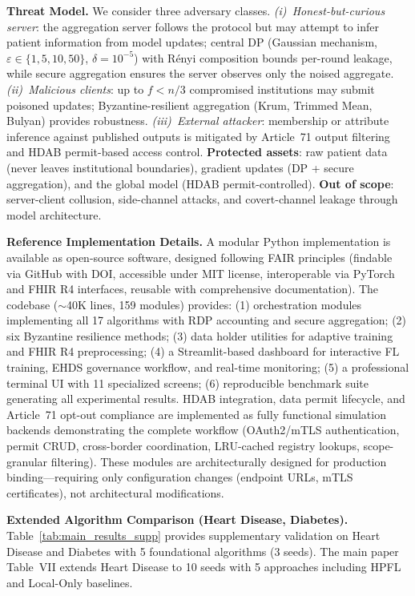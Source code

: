 \documentclass[conference]{IEEEtran}
\begin{document}
\smallskip\noindent\textbf{Threat Model.}
We consider three adversary classes. \textit{(i)~Honest-but-curious server}: the aggregation server follows the protocol but may attempt to infer patient information from model updates; central DP (Gaussian mechanism, $\varepsilon \in \{1{,}5{,}10{,}50\}$, $\delta{=}10^{-5}$) with R\'{e}nyi composition bounds per-round leakage, while secure aggregation ensures the server observes only the noised aggregate. \textit{(ii)~Malicious clients}: up to $f < n/3$ compromised institutions may submit poisoned updates; Byzantine-resilient aggregation (Krum, Trimmed Mean, Bulyan) provides robustness. \textit{(iii)~External attacker}: membership or attribute inference against published outputs is mitigated by Article~71 output filtering and HDAB permit-based access control. \textbf{Protected assets}: raw patient data (never leaves institutional boundaries), gradient updates (DP + secure aggregation), and the global model (HDAB permit-controlled). \textbf{Out of scope}: server-client collusion, side-channel attacks, and covert-channel leakage through model architecture.

\smallskip\noindent\textbf{Reference Implementation Details.}
A modular Python implementation is available as open-source software, designed following FAIR principles (findable via GitHub with DOI, accessible under MIT license, interoperable via PyTorch and FHIR R4 interfaces, reusable with comprehensive documentation). The codebase ($\sim$40K lines, 159 modules) provides: (1) orchestration modules implementing all 17 algorithms with RDP accounting and secure aggregation; (2) six Byzantine resilience methods; (3) data holder utilities for adaptive training and FHIR R4 preprocessing; (4) a Streamlit-based dashboard for interactive FL training, EHDS governance workflow, and real-time monitoring; (5) a professional terminal UI with 11 specialized screens; (6) reproducible benchmark suite generating all experimental results. HDAB integration, data permit lifecycle, and Article~71 opt-out compliance are implemented as fully functional simulation backends demonstrating the complete workflow (OAuth2/mTLS authentication, permit CRUD, cross-border coordination, LRU-cached registry lookups, scope-granular filtering). These modules are architecturally designed for production binding---requiring only configuration changes (endpoint URLs, mTLS certificates), not architectural modifications.

\smallskip\noindent\textbf{Extended Algorithm Comparison (Heart Disease, Diabetes).}
Table~\ref{tab:main_results_supp} provides supplementary validation on Heart Disease and Diabetes with 5 foundational algorithms (3 seeds). The main paper Table~VII extends Heart Disease to 10 seeds with 5 approaches including HPFL and Local-Only baselines.
\end{document}
